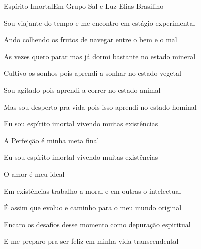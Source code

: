 \documentclass[a4,12pt,oneside]{book}
\newcommand{\RevDate}{\today}
\newcommand{\NotCCLIed}{\relax}
\begin{document}
\begin{song}{Espírito Imortal}{Em}
  {Grupo Sal e Luz}
  {Elias Brasilino}
  {}
  {\NotCCLIed}
  
	\renewcommand{\RevDate}{28 de abril de 2015}
 
	
	\ifChordBk	
		\vspace{-2em}\flushright{\Emchord \quad \Cchord \quad \Dchord}
		\vspace{-3ex}
	\fi

	\ifChordBk	
	\begin{SBOpGroup}
		\vspace{-2ex}
	\end{SBOpGroup}
	\fi
	
	\begin{SBVerse*}
		Sou viajante do tempo e me encontro em estágio experimental
		
		Ando colhendo os frutos de navegar entre o bem e o mal
		
		As vezes quero parar mas já dormi bastante no estado mineral
		
		Cultivo os sonhos pois aprendi a sonhar no estado vegetal
		
		Sou agitado pois aprendi a correr no estado animal
		
		Mas sou desperto pra vida pois isso aprendi no estado hominal
	\end{SBVerse*}
	

	\begin{SBOpGroup}
		\begin{SBBracket}{}
			Eu sou espírito imortal vivendo muitas existências
			
			A Perfeição é minha meta final
			
			Eu sou espírito imortal vivendo muitas existências
			
			O amor é meu ideal
		\end{SBBracket}
	\end{SBOpGroup}

	
	\begin{SBVerse*}
		Em existências trabalho a moral e em outras o intelectual
		
		É assim que evoluo e caminho para o meu mundo original
		
		Encaro os desafios desse momento como depuração espiritual 
		
		E me preparo pra ser feliz em minha vida transcendental
	\end{SBVerse*}


\end{song}
\end{document}
